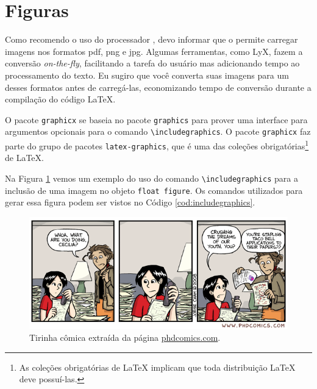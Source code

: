 \section{Figuras}

Como recomendo o uso do processador , devo informar que o  permite carregar imagens nos formatos \gls{pdf}, \gls{png} e \gls{jpg}. Algumas ferramentas, como LyX, fazem a conversão \textit{on-the-fly}, facilitando a tarefa do usuário mas adicionando tempo ao processamento do texto. Eu sugiro que você converta suas imagens para um desses formatos antes de carregá-las, economizando tempo de conversão durante a compilação do código \LaTeX{}.

O pacote \texttt{graphicx} se baseia no pacote \texttt{graphics} para prover uma interface para argumentos opcionais para o comando \texttt{\textbackslash{}includegraphics}. O pacote \texttt{graphicx} faz parte do grupo de pacotes \texttt{latex-graphics}, que é uma das coleções obrigatórias\footnote{As coleções obrigatórias de \LaTeX{} implicam que toda distribuição \LaTeX{} deve possuí-las.} de \LaTeX{}.

Na Figura \ref{fig:phdcomics}  vemos um exemplo do uso do comando \texttt{\textbackslash{}includegraphics} para a inclusão de uma imagem no objeto \texttt{float figure}. Os comandos utilizados para gerar essa figura podem ser vistos no Código \ref{cod:includegraphics}.

\begin{figure}[ht]
	\centering
	\includegraphics[width=14cm]{./imagens/capitulo3/phd020808s}
	\caption{Tirinha cômica extraída da página \url{phdcomics.com}.}
	\label{fig:phdcomics}
\end{figure}


